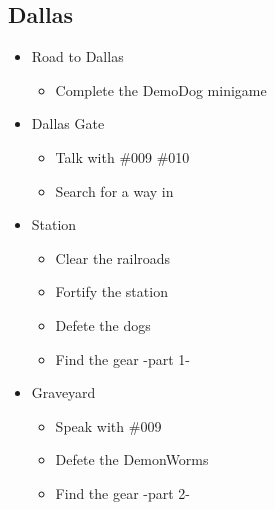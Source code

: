 \subsection{Dallas}
\begin{itemize}
	\item Road to Dallas
	\begin{itemize}	
		\item Complete the DemoDog minigame
	\end{itemize}
	\item Dallas Gate
	\begin{itemize}
		\item Talk with \#009 \#010
		\item Search for a way in
		\end{itemize}
	\item Station
	\begin{itemize}
		\item Clear the railroads
		\item Fortify the station
		\item Defete the dogs
		\item Find the gear -part 1-
	\end{itemize}
	\item Graveyard
	\begin{itemize}
		\item Speak with \#009
		\item Defete the DemonWorms
		\item Find the gear -part 2-
	\end{itemize}
\end{itemize}

